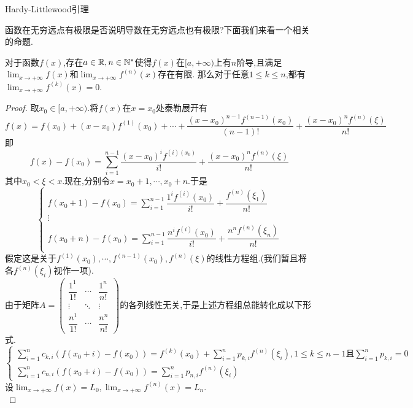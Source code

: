 \documentclass{ctexart}
\begin{document}
\pagestyle{empty}
\begin{center}\large Hardy-Littlewood引理\end{center}
函数在无穷远点有极限是否说明导数在无穷远点也有极限?下面我们来看一个相关的命题.
\begin{formal}
    对于函数$f(x)$,存在$a\in\mathbb{R},n\in\mathbb{N}^*$使得$f(x)$在$[a,+\infty)$上有$n$阶导,且满足%
    $\displaystyle\lim_{x\to+\infty}f(x)$和$\displaystyle\lim_{x\to+\infty}f^{(n)}(x)$存在有限.%
    那么对于任意$1\leqslant k\leqslant n$,都有$\displaystyle\lim_{x\to+\infty}f^{(k)}(x)=0$.
\end{formal}
\begin{proof}
    取$x_0\in[a,+\infty)$.将$f(x)$在$x=x_0$处泰勒展开有
    $$f(x)=f(x_0)+(x-x_0)f^{(1)}(x_0)+\cdots+\dfrac{(x-x_0)^{n-1}f^{(n-1)}(x_0)}{(n-1)!}+\dfrac{(x-x_0)^{n}f^{(n)}(\xi)}{n!}$$
    即$$f(x)-f(x_0)=\sum_{i=1}^{n-1}\dfrac{(x-x_0)^if^{(i)(x_0)}}{i!}+\dfrac{(x-x_0)^{n}f^{(n)}(\xi)}{n!}$$
    其中$x_0<\xi<x$.现在,分别令$x=x_0+1,\cdots,x_0+n$.于是
    $$\left\{\begin{array}{c}
        \displaystyle f(x_0+1)-f(x_0)=\sum_{i=1}^{n-1}\dfrac{1^if^{(i)}(x_0)}{i!}+\dfrac{f^{(n)}(\xi_1)}{n!}\\
        \vdots\\
        \displaystyle f(x_0+n)-f(x_0)=\sum_{i=1}^{n-1}\dfrac{n^if^{(i)}(x_0)}{i!}+\dfrac{n^nf^{(n)}(\xi_n)}{n!}\\
    \end{array}\right.$$
    假定这是关于$f^{(1)}(x_0),\cdots,f^{(n-1)}(x_0),f^{(n)}(\xi)$的线性方程组.(我们暂且将各$f^{(n)}(\xi_i)$视作一项).\\
    由于矩阵$A=\begin{pmatrix}
        \dfrac{1^1}{1!} & \cdots &\dfrac{1^n}{n!} \\
        \vdots & \ddots & \vdots \\
        \dfrac{n^1}{1!} & \cdots &\dfrac{n^n}{n!}
    \end{pmatrix}$的各列线性无关,于是上述方程组总能转化成以下形式.
    $$\left\{\begin{array}{l}
        \displaystyle\sum_{i=1}^{n}c_{k,i}\left(f(x_0+i)-f(x_0)\right)=f^{(k)}(x_0)+\sum_{i=1}^{n}p_{k,i}f^{(n)}(\xi_i),1\leqslant k\leqslant n-1\text{且}\sum_{i=1}^{n}{p_{k,i}}=0 \\
        \displaystyle\sum_{i=1}^{n}{c_{n,i}}\left(f(x_0+i)-f(x_0)\right)=\sum_{i=1}^{n}p_{n,i}f^{(n)}(\xi_i)
    \end{array}\right.$$
    设$\displaystyle\lim_{x\to+\infty}f(x)=L_0,\displaystyle\lim_{x\to+\infty}f^{(n)}(x)=L_n$.\\

\end{proof}
\end{document}
